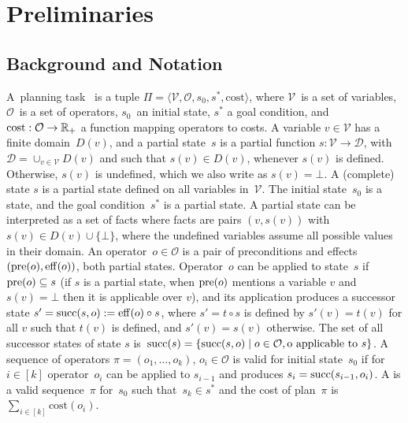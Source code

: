 \chapter{Preliminaries}\label{sec:preliminaries}

\section{Background and Notation}

A~\sas planning task~\cite{Backstrom.Nebel/1995} is a tuple $\Pi=\langle\mathcal{V},\mathcal{O},s_0,s^*, \text{cost}\rangle$, where $\mathcal{V}$~is a set of variables, $\mathcal{O}$~is a set of operators, $s_0$~an initial state, $s^*$ a goal condition, and $\text{cost}:\mathcal{O}\rightarrow\mathbb{R}_{+}$ a function mapping operators to costs. A variable $v\in \mathcal{V}$ has a finite domain~$D(v)$, and a partial state~$s$ is a partial function $s:\mathcal{V}\rightarrow \mathcal{D}$, with $\mathcal{D}=\cup_{v\in \mathcal{V}}D(v)$ and such that $s(v)\in D(v)$, whenever $s(v)$ is defined. Otherwise, $s(v)$ is undefined, which we also write as $s(v)=\bot$. A (complete) state $s$ is a partial state defined on all variables in~$\mathcal{V}$. The initial state~$s_0$ is a state, and the goal condition~$s^*$ is a partial state. A partial state can be interpreted as a set of facts where facts are pairs $(v,s(v))$ with $s(v)\in D(v) \cup \{\bot\}$, where the undefined variables assume all possible values in their domain. An operator~$o\in \mathcal{O}$ is a pair of preconditions and effects $(\operatorname{pre}(o),\operatorname{eff}(o))$, both partial states. Operator~$o$ can be applied to state~$s$ if $\operatorname{pre}(o)\subseteq s$ (if $s$ is a partial state, when $\operatorname{pre}(o)$ mentions a variable $v$ and $s(v) = \bot$ then it is applicable over $v$), and its application produces a successor state $s'=\operatorname{succ}(s,o):=\operatorname{eff}(o)\circ s$, where $s'=t\circ s$ is defined by $s'(v)=t(v)$ for all $v$ such that $t(v)$ is defined, and $s'(v)=s(v)$ otherwise. The set of all successor states of state $s$ is~$\operatorname{succ}(s)=\{\operatorname{succ}(s,o)\mid o\in \mathcal{O}, \text{o applicable to }s\}$.  A sequence of operators $\pi=(o_1,\ldots,o_k)$, $o_i\in \mathcal{O}$ is valid for initial state~$s_0$ if for $i\in[k]$ operator~$o_i$ can be applied to $s_{i-1}$ and produces $s_i=\operatorname{succ}(s_{i-1},o_i)$. A  is a valid sequence~$\pi$ for~$s_0$ such that~$s_k\in s^*$ and the cost of plan~$\pi$ is $\sum_{i\in[k]} \text{cost}(o_i)$.

